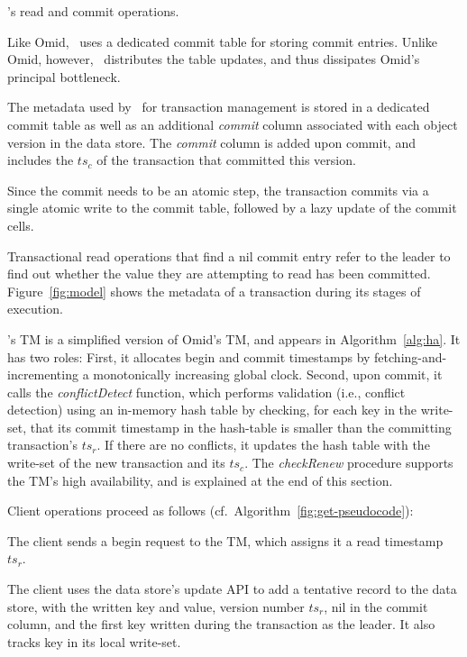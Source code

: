\begin{algorithm}[t]
\begin{algorithmic}
  \end{algorithmic}
  \caption{\sysll's read and commit operations.} 
  \label{fig:get-pseudocode}
\end{algorithm} 

Like Omid, \sysll\ uses a dedicated commit table for storing commit entries. 
Unlike Omid, however, \sysll\ distributes the table updates, and thus dissipates Omid's principal bottleneck.
 

The metadata used by \sysll\ for transaction management is stored in a dedicated commit table 
as well as an   additional \emph{commit} column associated with each object version in the data store.
The \emph{commit} column is added upon commit, and includes  the  $ts_c$ of the transaction that
committed this version. 


Since the commit needs to be an atomic step, the transaction commits via a single atomic write 
to the commit table, followed by a lazy update of the commit cells. 

Transactional read operations that find a nil commit entry 
refer to the leader to find out whether the value they are attempting to read has been committed.
Figure~\ref{fig:model} shows the metadata of a transaction during its stages of execution. 

\sysll's TM is a simplified version of Omid's TM, and appears  in Algorithm~\ref{alg:ha}. It has two roles:
First, it allocates begin and commit timestamps by fetching-and-incrementing a monotonically increasing global clock.
Second, upon commit, it calls the \emph{conflictDetect} function, which 
performs validation (i.e., conflict detection) using an in-memory hash table
by checking, for each key in the write-set, that its commit timestamp in the hash-table is smaller than the 
committing transaction's $ts_r$. If there are no conflicts, it 
updates the hash table with the write-set of the new transaction and its $ts_c$. 
The  \emph{checkRenew} procedure supports the TM's  high availability, and is explained at the end of this section.

\noindent
Client operations proceed as follows (cf.~Algorithm~\ref{fig:get-pseudocode}):

The client sends a begin request to the TM, which assigns it a read timestamp $ts_r$.

The client uses the data store's update API to add a tentative record to the data store, with the written key and value, 
version number $ts_r$, nil in the commit column, and the first key written during the transaction as the leader.
It also tracks key in its local write-set.

